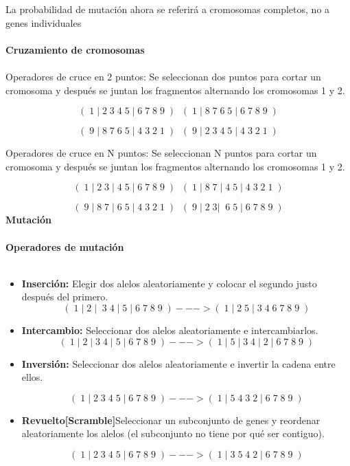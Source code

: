 \documentclass[10pt,letterpaper]{article}
\begin{document}
La probabilidad de mutación ahora se referirá a cromosomas completos, no a genes individuales
\\\\
\textbf{\large Cruzamiento de cromosomas}
\\\\
Operadores de cruce en 2 puntos: Se seleccionan dos puntos para cortar un cromosoma y después se juntan los fragmentos alternando los cromosomas 1 y 2.

\[( \;1\;|\;2\;3\;4\;5\;|\;6\;7\;8\;9\; )\;\;  ( \;1\;|\;8\;7\;6\;5\;|\;6\;7\;8\;9\; )\]

\[( \;9\;|\;8\;7\;6\;5\;|\;4\;3\;2\;1\; )\;\;  ( \;9\;|\;2\;3\;4\;5\;|\;4\;3\;2\;1\; )\]

Operadores de cruce en N puntos: Se seleccionan N puntos para cortar un cromosoma y después se juntan los fragmentos alternando los cromosomas 1 y 2.

\[( \;1\;|\;2\;3\;|\;4\;5\;|\;6\;7\;8\;9\; )\;\;  ( \;1\;|\;8\;7\;|\;4\;5\;|\;4\;3\;2\;1\; )\]

\[( \;9\;|\;8\;7\;|\;6\;5\;|\;4\;3\;2\;1\; )\;\;  ( \;9\;|\;2\;3|\;\;6\;5\;|\;6\;7\;8\;9\; )\]
\textbf{\large Mutación}
\\\\
\textbf{Operadores de mutación}
\\\\
\begin{itemize}
\item \textbf{Inserción: }Elegir dos alelos aleatoriamente y colocar el segundo justo después del primero.
\[( \;1\;|\;2\;|\;\;3\;4\;|\;5\;|\;6\;7\;8\;9\; ) ---> ( \;1\;|\;2\;5\;|\;3\;4\;6\;7\;8\;9\; )\]
\item \textbf{Intercambio: }Seleccionar dos alelos aleatoriamente e intercambiarlos.
\[( \;1\;|\;2\;|\;3\;4\;|\;5\;|\;6\;7\;8\;9\; ) ---> ( \;1\;|\;5\;|\;3\;4\;|\;2\;|\;6\;7\;8\;9\; )\]
\item \textbf{Inversión: }Seleccionar dos alelos aleatoriamente e invertir la cadena entre ellos.

\[( \;1\;|\;2\;3\;4\;5\;|\;6\;7\;8\;9\; ) ---> ( \;1\;|\;5\;4\;3\;2\;|\;6\;7\;8\;9\; )\]

\item \textbf{Revuelto[Scramble]}Seleccionar un subconjunto de genes y reordenar aleatoriamente los alelos (el subconjunto no tiene por qué ser contiguo).

\[( \;1\;|\;2\;3\;4\;5\;|\;6\;7\;8\;9\; ) ---> ( \;1\;|\;3\;5\;4\;2\;|\;6\;7\;8\;9\; )\]

\end{itemize}
\end{document}
